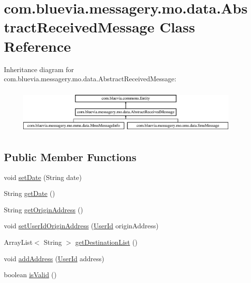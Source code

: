 \hypertarget{classcom_1_1bluevia_1_1messagery_1_1mo_1_1data_1_1AbstractReceivedMessage}{
\section{com.bluevia.messagery.mo.data.AbstractReceivedMessage Class Reference}
\label{classcom_1_1bluevia_1_1messagery_1_1mo_1_1data_1_1AbstractReceivedMessage}
}
Inheritance diagram for com.bluevia.messagery.mo.data.AbstractReceivedMessage:\begin{figure}[H]
\begin{center}
\leavevmode
\includegraphics[height=2.359551cm]{classcom_1_1bluevia_1_1messagery_1_1mo_1_1data_1_1AbstractReceivedMessage}
\end{center}
\end{figure}
\subsection*{Public Member Functions}
\begin{DoxyCompactItemize}
\item 
void \hyperlink{classcom_1_1bluevia_1_1messagery_1_1mo_1_1data_1_1AbstractReceivedMessage_a465f44fba12ca330e91bfe60c9e814b3}{setDate} (String date)
\item 
String \hyperlink{classcom_1_1bluevia_1_1messagery_1_1mo_1_1data_1_1AbstractReceivedMessage_a43d1de21c5a5fef126d2dcc4123d3846}{getDate} ()
\item 
String \hyperlink{classcom_1_1bluevia_1_1messagery_1_1mo_1_1data_1_1AbstractReceivedMessage_ab50f0da03aadb3dff47d6f4ccc6330ed}{getOriginAddress} ()
\item 
void \hyperlink{classcom_1_1bluevia_1_1messagery_1_1mo_1_1data_1_1AbstractReceivedMessage_ac89281d1a1a87e379a36340b795e69c3}{setUserIdOriginAddress} (\hyperlink{classcom_1_1bluevia_1_1commons_1_1data_1_1UserId}{UserId} originAddress)
\item 
ArrayList$<$ String $>$ \hyperlink{classcom_1_1bluevia_1_1messagery_1_1mo_1_1data_1_1AbstractReceivedMessage_ad1df097a24da45112e80a9030dc1da42}{getDestinationList} ()
\item 
void \hyperlink{classcom_1_1bluevia_1_1messagery_1_1mo_1_1data_1_1AbstractReceivedMessage_af17d50fe41ca56cde74aca9bfbf8fc78}{addAddress} (\hyperlink{classcom_1_1bluevia_1_1commons_1_1data_1_1UserId}{UserId} address)
\item 
boolean \hyperlink{classcom_1_1bluevia_1_1messagery_1_1mo_1_1data_1_1AbstractReceivedMessage_a54794afbe03b26ec95a10150563bf901}{isValid} ()
\end{DoxyCompactItemize}
